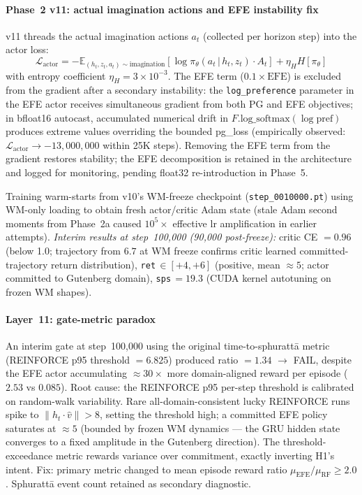\documentclass[journal,onecolumn,11pt]{IEEEtran}
\begin{document}
\paragraph{Phase~2 v11: actual imagination actions and EFE instability fix}
v11 threads the actual imagination actions $a_t$ (collected per horizon step) into the actor loss:
\begin{equation}
  \mathcal{L}_\text{actor} = -\mathbb{E}_{(h_t,z_t,a_t)\sim\text{imagination}}\!\left[\log\pi_\theta(a_t\,|\,h_t,z_t)\cdot A_t\right] + \eta_H H[\pi_\theta]
  \label{eq:v11_actor}
\end{equation}
with entropy coefficient $\eta_H{=}3{\times}10^{-3}$.
The EFE term ($0.1\times\text{EFE}$) is excluded from the gradient after a secondary instability:
the \texttt{log\_preference} parameter in the EFE actor receives simultaneous gradient from
both PG and EFE objectives; in bfloat16 autocast, accumulated numerical drift in
$F.\text{log\_softmax}(\log\text{pref})$ produces extreme values overriding the bounded
pg\_loss (empirically observed: $\mathcal{L}_\text{actor}\to -13{,}000{,}000$ within 25K steps).
Removing the EFE term from the gradient restores stability;
the EFE decomposition is retained in the architecture and logged for monitoring,
pending float32 re-introduction in Phase~5.

Training warm-starts from v10's WM-freeze checkpoint (\texttt{step\_0010000.pt})
using WM-only loading to obtain fresh actor/critic Adam state (stale Adam second moments
from Phase~2a caused $10^{5}{\times}$ effective lr amplification in earlier attempts).
\emph{Interim results at step~100{,}000 (90{,}000 post-freeze):}
critic CE $= 0.96$ (below 1.0; trajectory from $6.7$ at WM freeze confirms critic learned
committed-trajectory return distribution),
\texttt{ret}$\,\in[+4,+6]$ (positive, mean ${\approx}5$; actor committed to Gutenberg domain),
\texttt{sps}$\,=19.3$ (CUDA kernel autotuning on frozen WM shapes).

\paragraph{Layer~11: gate-metric paradox}
An interim gate at step~100{,}000 using the original time-to-sphurattā metric (REINFORCE p95
threshold $=6.825$) produced ratio $=1.34$ $\to$ FAIL, despite the EFE actor accumulating
${\approx}30{\times}$ more domain-aligned reward per episode ($2.53$ vs $0.085$).
Root cause: the REINFORCE p95 per-step threshold is calibrated on random-walk variability.
Rare all-domain-consistent lucky REINFORCE runs spike to $\|h_t\cdot\hat{v}\|>8$, setting
the threshold high; a committed EFE policy saturates at ${\approx}5$ (bounded by frozen WM
dynamics — the GRU hidden state converges to a fixed amplitude in the Gutenberg direction).
The threshold-exceedance metric rewards variance over commitment, exactly inverting H1's intent.
Fix: primary metric changed to mean episode reward ratio $\mu_{\text{EFE}} / \mu_{\text{RF}} \geq 2.0$.
Sphurattā event count retained as secondary diagnostic.
\end{document}
